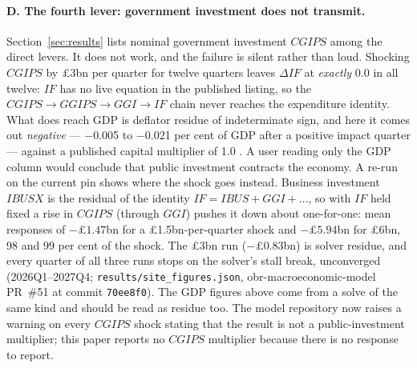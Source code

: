 \paragraph{D. The fourth lever: government investment does not transmit.} Section~\ref{sec:results} lists nominal government investment $CGIPS$ among the direct levers. It does not work, and the failure is silent rather than loud. Shocking $CGIPS$ by \pounds 3bn per quarter for twelve quarters leaves $\Delta IF$ at \emph{exactly} 0.0 in all twelve: $IF$ has no live equation in the published listing, so the $CGIPS \to GGIPS \to GGI \to IF$ chain never reaches the expenditure identity. What does reach GDP is deflator residue of indeterminate sign, and here it comes out \emph{negative} --- $-$0.005 to $-$0.021 per cent of GDP after a positive impact quarter --- against a published capital multiplier of 1.0 \citep{obr2010multipliers}. A user reading only the GDP column would conclude that public investment contracts the economy. A re-run on the current pin shows where the shock goes instead. Business investment $IBUSX$ is the residual of the identity $IF = IBUS + GGI + \dots$, so with $IF$ held fixed a rise in $CGIPS$ (through $GGI$) pushes it down about one-for-one: mean responses of $-\pounds1.47$bn for a \pounds 1.5bn-per-quarter shock and $-\pounds5.94$bn for \pounds 6bn, 98 and 99 per cent of the shock. The \pounds 3bn run ($-\pounds0.83$bn) is solver residue, and every quarter of all three runs stops on the solver's stall break, unconverged (2026Q1--2027Q4; \texttt{results/site\_figures.json}, obr-macroeconomic-model PR~\#51 at commit \texttt{70ee8f0}). The GDP figures above come from a solve of the same kind and should be read as residue too. The model repository now raises a warning on every $CGIPS$ shock stating that the result is not a public-investment multiplier; this paper reports no $CGIPS$ multiplier because there is no response to report.

